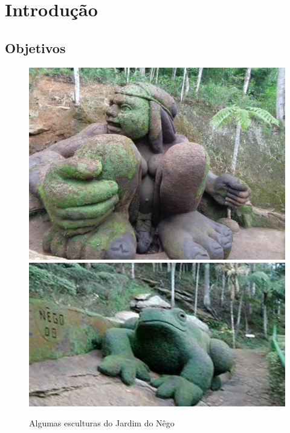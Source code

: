\documentclass[table, usenames, svgnames, xcolor=dvipsnames]{beamer}
\begin{document}
\section{Introdução}


\subsection{Objetivos}
\begin{frame} 
	\begin{figure}[!h]
		\centering
		\includegraphics[width=0.45\linewidth]{figs/jardim-do-nego.jpg}
		\quad 
		\includegraphics[width=0.5\linewidth]{figs/jardim-do-nego32.jpg}
		\caption{%
			Algumas esculturas do Jardim do Nêgo 
		}
	\end{figure}
\end{frame}

%		
%
%
%		
\end{document}
